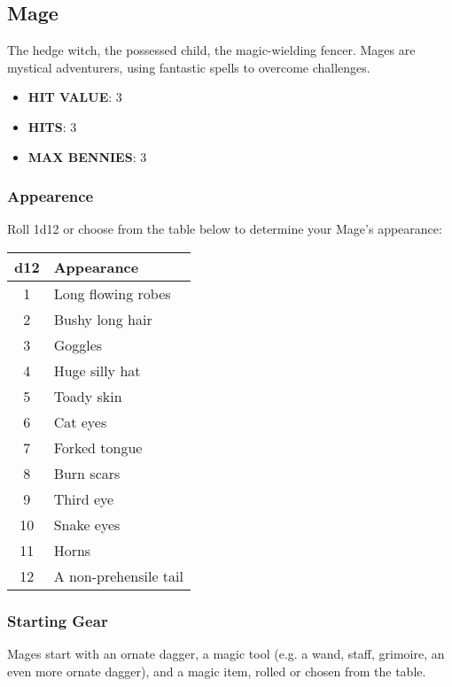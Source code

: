 \newpage
\subsection{Mage}
The hedge witch, the possessed child, the magic-wielding fencer. Mages are mystical adventurers, using fantastic spells to overcome challenges.

\begin{multicols}{2}
\begin{itemize}
  \item \textbf{HIT VALUE}: 3
  \item \textbf{HITS}: 3
  \item \textbf{MAX BENNIES}: 3
\end{itemize}

\subsubsection*{Appearence}
Roll 1d12 or choose from the table below to determine your Mage's appearance:

\begin{adjustbox}{width=0.6\columnwidth,center}
\begin{tabular}{|c|l|}
\hline
\textbf{d12} & \textbf{Appearance} \\
\hline
1 & Long flowing robes \\
2 & Bushy long hair \\
3 & Goggles \\
4 & Huge silly hat \\
5 & Toady skin \\
6 & Cat eyes \\
7 & Forked tongue \\
8 & Burn scars \\
9 & Third eye \\
10 & Snake eyes \\
11 & Horns \\
12 & A non-prehensile tail \\
\hline
\end{tabular}
\end{adjustbox}

\subsubsection*{Starting Gear}
Mages start with an ornate dagger, a magic tool (e.g. a wand, staff, grimoire, an even more ornate dagger), and a magic item, rolled or chosen from the table.


\end{multicols}
